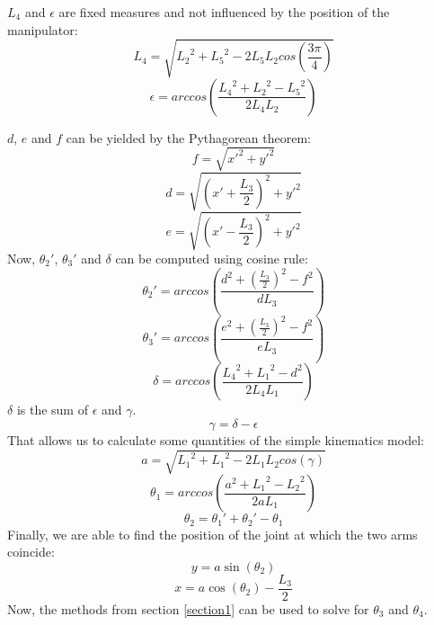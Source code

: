 \documentclass{sig-alternate-05-2015}
\begin{document}
$L_4$ and $\epsilon$ are fixed measures and not influenced by the position of the manipulator:
\begin{equation}
L_4 = \sqrt{{L_2}^2 + {L_5}^2 - 2L_5L_2cos\left(\frac{3\pi}{4}\right)}
\label{eqn:L4}
\end{equation}
\begin{equation}
\epsilon = arccos\left(  \frac{{L_4}^2 + {L_2}^2 - {L_5}^2}{2L_4L_2} \right)
\label{eqn:tepsilon}
\end{equation}

$d$, $e$ and $f$ can be yielded by the Pythagorean theorem:
\begin{equation}
f = \sqrt{{x'}^2 + {y'}^2}
\label{eqn:f}
\end{equation}
\begin{equation}
d = \sqrt{\left(x'+ \frac{L_3}{2}\right)^2 + {y'}^2}
\end{equation}
\begin{equation}
e = \sqrt{\left(x'- \frac{L_3}{2}\right)^2 + {y'}^2}
\end{equation}
Now, $\theta_2'$, $\theta_3'$ and $\delta$ can be computed using cosine rule:
\begin{equation}
\theta_2' = arccos\left(  \frac{d^2 + (\frac{L_3}{2})^2 - f^2}{dL_3} \right)
\label{eqn:theta2prime}
\end{equation}
\begin{equation}
\theta_3' = arccos\left(  \frac{e^2 + (\frac{L_3}{2})^2 - f^2}{eL_3} \right)
\label{eqn:theta3prime}
\end{equation}
\begin{equation}
\delta = arccos\left(  \frac{{L_4}^2 + {L_1}^2 - d^2}{2L_4L_1} \right)
\label{eqn:delta}
\end{equation}
$\delta$ is the sum of $\epsilon$ and $\gamma$.
\begin{equation}
\gamma = \delta - \epsilon
\end{equation}
That allows us to calculate some quantities of the simple kinematics model:
\begin{equation}
a = \sqrt{{L_1}^2 + {L_1}^2 - 2L_1L_2cos\left(\gamma\right)}
\end{equation}
\begin{equation}
\theta_1 = arccos\left(  \frac{a^2 + {L_1}^2 - {L_2}^2}{2aL_1} \right)
\end{equation}
\begin{equation}
\theta_2 = \theta_1' + \theta_2' - \theta_1
\end{equation}
Finally, we are able to find the position of the joint at which the two arms coincide:
\begin{equation}
y = a \sin(\theta_2)
\end{equation}
\begin{equation}
x = a\cos(\theta_2) - \frac{L_3}{2}
\end{equation}
Now, the methods from section \ref{section1} can be used to solve for $\theta_3$ and $\theta_4$.
\end{document}

